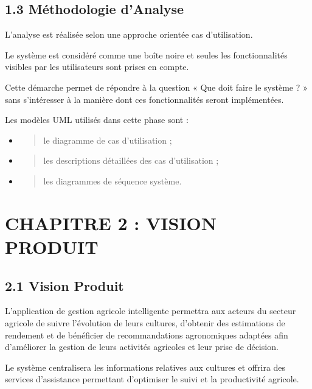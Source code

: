 \documentclass[
]{article}
\begin{document}
\hypertarget{muxe9thodologie-danalyse}{%
\subsection{1.3 Méthodologie d'Analyse}\label{muxe9thodologie-danalyse}}

L'analyse est réalisée selon une approche orientée cas d'utilisation.

Le système est considéré comme une boîte noire et seules les
fonctionnalités visibles par les utilisateurs sont prises en compte.

Cette démarche permet de répondre à la question « Que doit faire le
système ? » sans s'intéresser à la manière dont ces fonctionnalités
seront implémentées.

Les modèles UML utilisés dans cette phase sont :

\begin{itemize}
\item
  \begin{quote}
  le diagramme de cas d'utilisation ;
  \end{quote}
\item
  \begin{quote}
  les descriptions détaillées des cas d'utilisation ;
  \end{quote}
\item
  \begin{quote}
  les diagrammes de séquence système.
  \end{quote}
\end{itemize}

\hypertarget{chapitre-2-vision-produit}{%
\section{CHAPITRE 2 : VISION PRODUIT}\label{chapitre-2-vision-produit}}

\hypertarget{vision-produit}{%
\subsection{2.1 Vision Produit}\label{vision-produit}}

L'application de gestion agricole intelligente permettra aux acteurs du
secteur agricole de suivre l'évolution de leurs cultures, d'obtenir des
estimations de rendement et de bénéficier de recommandations
agronomiques adaptées afin d'améliorer la gestion de leurs activités
agricoles et leur prise de décision.

Le système centralisera les informations relatives aux cultures et
offrira des services d'assistance permettant d'optimiser le suivi et la
productivité agricole.
\end{document}
